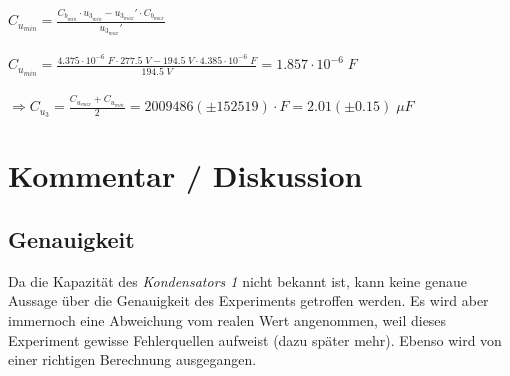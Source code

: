 \documentclass[a4paper,12pt]{article}
\begin{document}
$C_{u_{min}} = \displaystyle{\frac{C_{b_{min}}\cdot u_{3_{min}}-u_{3_{max}}'\cdot C_{b_{max}}}{u_{3_{max}}'}}$\\\\

$C_{u_{min}} = \displaystyle{\frac{4.375\cdot 10^{-6}\;F\cdot 277.5\;V-194.5\;V\cdot 4.385\cdot 10^{-6}\;F}{194.5\;V}} = 1.857\cdot 10^{-6}\; F$\\\\

$\Rightarrow C_{u_3}=\displaystyle{\frac{C_{u_{max}}+C_{u_{min}}}{2}} = 2009486 (\pm 152519)\cdot F = 2.01 (\pm 0.15)\;\mu F$

\section{Kommentar / Diskussion}

\subsection{Genauigkeit}

Da die Kapazität des \textit{Kondensators 1} nicht bekannt ist, kann keine genaue Aussage über die Genauigkeit des Experiments getroffen werden. Es wird aber immernoch eine Abweichung vom realen Wert angenommen, weil dieses Experiment gewisse Fehlerquellen aufweist (dazu später mehr). Ebenso wird von einer richtigen Berechnung ausgegangen.\\







\end{document}

